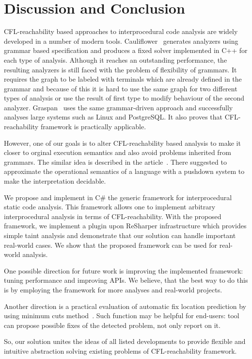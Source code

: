 \section{Discussion and Conclusion}

CFL-reachability based approaches to interprocedural code analysis are widely developed in a number of modern tools.
Cauliflower~\cite{LPAR-21:Cauliflower_Solver_Generator_for} generates analyzers using grammar based specification and produces a fixed solver implemented in C++ for each type of analysis.
Although it reaches an outstanding performance, the resulting analyzers is still faced with the problem of flexibility of grammars.
It requires the graph to be labeled with terminals which are already defined in the grammar and because of this it is hard to use the same graph for two different types of analysis or use the result of first type to modify behaviour of the second analyzer.
Graspan~\cite{Wang:2017:GSD:3093315.3037744} uses the same grammar-driven approach and successfully analyses large systems such as Linux and PostgreSQL.
It also proves that CFL-reachability framework is practically applicable.

However, one of our goals is to alter CFL-reachability based analysis to make it closer to orginal execution semantics and also avoid problems inherited from grammars.
The similar idea is described in the article~\cite{Facchinetti:2019:HDP:3343145.3310340}.
There suggested to approximate the operational semantics of a language with a pushdown system to make the interpretation decidable.

We propose and implement in C\# the generic framework for interprocedural static code analysis.
This framework allows one to implement arbitrary interprocedural analysis in terms of CFL-reachability.
With the proposed framework, we implement a plugin upon ReSharper infrastructure which provides simple taint analysis and demonstrate that our solution can handle important real-world cases.
We show that the proposed framework can be used for real-world analysis.

One possible direction for future work is improving the implemented framework: tuning performance and improving APIs. 
We believe, that the best way to do this is by employing the framework for more analyses and real-world projects. 

Another direction is a practical evaluation of automatic fix location prediction by using minimum cuts method~\cite{10.1007/978-3-319-63390-9_27}.
Such function may be helpful for end-users: tool can propose possible fixes of the detected problem, not only report on it.

So, our solution unites the ideas of all listed developments to provide flexible and intuitive abstraction solving existing problems of CFL-reachability framework.
